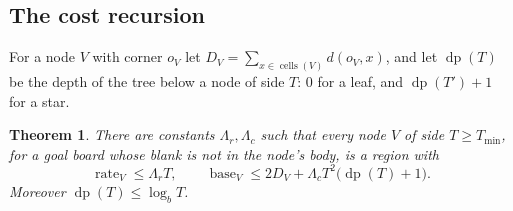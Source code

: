 \documentclass[11pt]{amsart}
\newtheorem{theorem}{Theorem}[section]
\theoremstyle{definition}
\newcommand{\cells}{\operatorname{cells}}
\newcommand{\base}{\operatorname{base}}
\newcommand{\rate}{\operatorname{rate}}
\begin{document}
\subsection{The cost recursion}

For a node $V$ with corner $o_V$ let $D_V=\sum_{x\in\cells(V)}d(o_V,x)$, and let $\operatorname{dp}(T)$ be the depth of
the tree below a node of side $T$: $0$ for a leaf, and $\operatorname{dp}(T')+1$ for a star.

\begin{theorem}\label{thm:tree}
There are constants $\Lambda_r,\Lambda_c$ such that every node $V$ of side $T\ge T_{\min}$, for a goal board whose blank is not in
the node's body, is a region with
\[
\rate_V\le \Lambda_rT,\qquad \base_V\le 2D_V+\Lambda_cT^2\bigl(\operatorname{dp}(T)+1\bigr).
\]
Moreover $\operatorname{dp}(T)\le\log_bT$.
\end{theorem}
\end{document}
